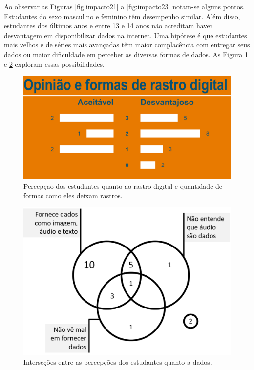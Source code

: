 \documentclass[
]{book}
\begin{document}
Ao observar as Figuras \ref{fig:impacto21} a \ref{fig:impacto23} notam-se alguns pontos. Estudantes do sexo masculino e feminino têm desempenho similar. Além disso, estudantes dos últimos anos e entre 13 e 14 anos não acreditam haver desvantagem em disponibilizar dados na internet. Uma hipótese é que estudantes mais velhos e de séries mais avançadas têm maior complacência com entregar seus dados ou maior dificuldade em perceber as diversas formas de dados. As Figura \ref{fig:impacto24} e \ref{fig:impacto25} exploram essas possibilidades.

\begin{figure}

{\centering \includegraphics[width=0.75\linewidth,height=0.75\textheight]{images/Impactos/24} 

}

\caption{Percepção dos estudantes quanto ao rastro digital e quantidade de formas como eles deixam rastros.}\label{fig:impacto24}
\end{figure}

\begin{figure}

{\centering \includegraphics[width=0.75\linewidth,height=0.75\textheight]{images/Impactos/25} 

}

\caption{Interseções entre as percepções dos estudantes quanto a dados.}\label{fig:impacto25}
\end{figure}
\end{document}
